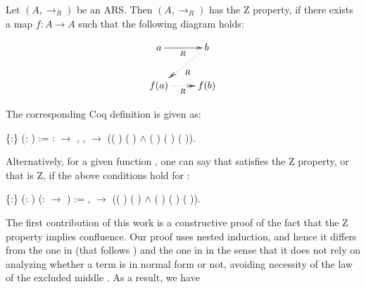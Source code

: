     \begin{definition} Let $(A,\to_R)$ be an ARS. Then $(A,\to_R)$
      has the Z property, if there exists a map $f:A \to A$ such that
      the following diagram holds:
    
      \[ \xymatrix{ a \ar[r]_R & b \ar@{.>>}[dl]^R\\ f(a)
      \ar@{.>>}[r]_R & f(b) \\ } \] \end{definition}


The corresponding Coq definition is given as: \begin{coqdoccode}
\coqdocemptyline
\coqdocnoindent
{}  \{:\} (:  ) := \coqdoctac{\ensuremath{\exists}} : \ensuremath{\rightarrow} , \coqdockw{\ensuremath{\forall}}  ,    \ensuremath{\rightarrow} (( )  ( ) \ensuremath{\land} ( ) ( ) ( )).\coqdoceol
\coqdocemptyline
\end{coqdoccode}
Alternatively, for a given function , one can say that  satisfies the Z property, or that  is Z, if the above conditions hold for : \begin{coqdoccode}
\coqdocemptyline
\coqdocnoindent
{}  \{:\} (:  ) (:  \ensuremath{\rightarrow} ) := \coqdockw{\ensuremath{\forall}}  ,    \ensuremath{\rightarrow} (( )   ( ) \ensuremath{\land} ( ) ( ) ( )).\coqdoceol
\coqdocemptyline
\end{coqdoccode}
The first contribution of this work is a constructive proof of the
    fact that the Z property implies confluence. Our proof uses nested
    induction, and hence it differs from the one in \cite{kes09}
    (that follows \cite{dehornoy2008z}) and the one in \cite{zproperty} 
    in the sense that it does not rely on analyzing whether 
    a term is in normal form or not, avoiding necessity of 
    the law of the excluded middle . As a result, we have 
